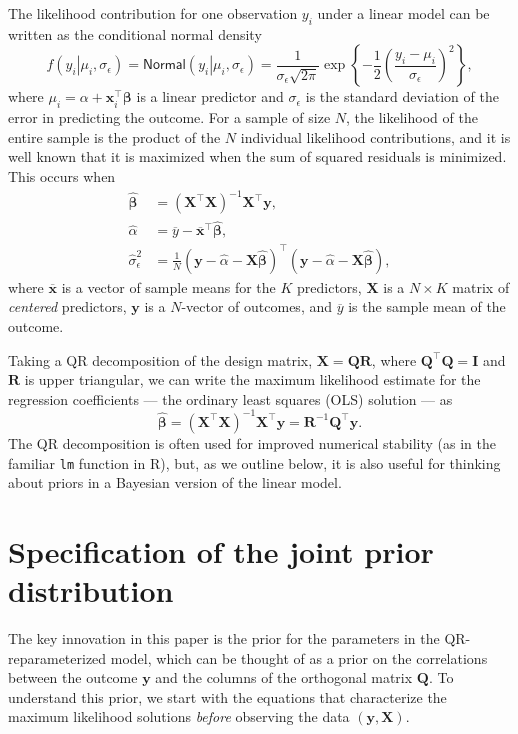 \documentclass[11pt]{article}
\newcommand{\boldbeta}{\boldsymbol{\beta}}
\newcommand{\hatbeta}{\widehat{\boldbeta}}
\newcommand{\hatalpha}{\widehat{\alpha}}
\newcommand{\sigmaEps}{\sigma_{\epsilon}}
\newcommand{\X}{\mathbf{X}}
\newcommand{\y}{\mathbf{y}}
\newcommand{\Q}{\mathbf{Q}}
\newcommand{\R}{\mathbf{R}}
\newcommand{\given}{\left.\right|}
\begin{document}
The likelihood contribution for one observation $y_i$ under a linear model
can be written as the conditional normal density
%
$$
f \left(y_i \given \mu_i, \sigmaEps \right) =
\mathsf{Normal}\left(y_i \given \mu_i, \sigmaEps \right) =
\frac{1}{\sigmaEps \sqrt{2 \pi}}
\exp{\left\{-\frac{1}{2} \left(\frac{y_i - \mu_i}{\sigmaEps}\right)^2\right\}},
$$
%
where $\mu_i = \alpha + \mathbf{x}_i^\top \boldbeta$ is a linear predictor and
$\sigmaEps$ is the standard deviation of the error in predicting the outcome.
For a sample of size $N$, the likelihood of the entire sample is the product of
the $N$ individual likelihood contributions, and it is well known that it is
maximized when the sum of squared residuals is minimized. This occurs when
%
\begin{align*}
\hatbeta &= \left(\X^\top \X \right)^{-1} \X^\top \y,\\
\hatalpha &= \overline{y} - \overline{\mathbf{x}}^\top \hatbeta,\\
\widehat{\sigma}_{\epsilon}^2 &=
  \frac{1}{N}
  \left(\y - \hatalpha - \X \hatbeta \right)^\top
  \left(\y - \hatalpha - \X \hatbeta \right),
\end{align*}
%
where $\overline{\mathbf{x}}$ is a vector of sample means for the
$K$ predictors, $\X$ is a $N \times K$ matrix of \emph{centered} predictors,
$\y$ is a $N$-vector of outcomes, and $\overline{y}$ is the sample mean of the
outcome.

Taking a QR decomposition of the design matrix, $\X = \Q\R$, where $\Q^\top \Q =
\mathbf{I}$ and $\R$ is upper triangular, we can write the maximum likelihood
estimate for the regression coefficients --- the ordinary least squares (OLS)
solution --- as
$$\hatbeta = \left(\X^\top \X \right)^{-1} \X^\top \y = \R^{-1} \Q^\top \y.$$
%
The QR decomposition is often used for improved numerical stability (as in the
familiar {\tt lm} function in R), but, as we outline below, it is also useful
for thinking about priors in a Bayesian version of the linear model.


\section{Specification of the joint prior distribution}
\label{sec:priors}

The key innovation in this paper is the prior for the parameters in the
QR-reparameterized model, which can be thought of as a prior on the correlations
between the outcome $\y$ and the columns of the orthogonal matrix $\Q$. To
understand this prior, we start with the equations that characterize the maximum
likelihood solutions \emph{before} observing the data $\left(\y, \X\right)$.
\end{document}
